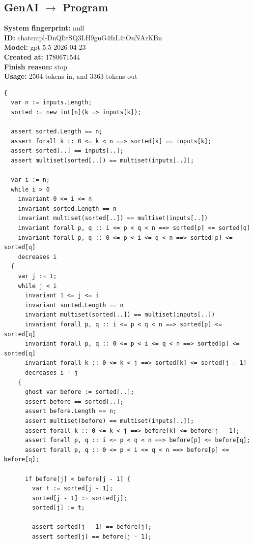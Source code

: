 \documentclass{article}
\begin{document}
\subsection*{GenAI $\rightarrow$ Program}
\textbf{System fingerprint: }null
\\\textbf{ID: }chatcmpl-DnQIitSQ3LH9guG4fzL4tOuNArKBn
\\\textbf{Model: }gpt-5.5-2026-04-23
\\\textbf{Created at: }1780671544
\\\textbf{Finish reason: }stop
\\\textbf{Usage: }2504 tokens in, and 3363 tokens out
\begin{lstlisting}
{
  var n := inputs.Length;
  sorted := new int[n](k => inputs[k]);

  assert sorted.Length == n;
  assert forall k :: 0 <= k < n ==> sorted[k] == inputs[k];
  assert sorted[..] == inputs[..];
  assert multiset(sorted[..]) == multiset(inputs[..]);

  var i := n;
  while i > 0
    invariant 0 <= i <= n
    invariant sorted.Length == n
    invariant multiset(sorted[..]) == multiset(inputs[..])
    invariant forall p, q :: i <= p < q < n ==> sorted[p] <= sorted[q]
    invariant forall p, q :: 0 <= p < i <= q < n ==> sorted[p] <= sorted[q]
    decreases i
  {
    var j := 1;
    while j < i
      invariant 1 <= j <= i
      invariant sorted.Length == n
      invariant multiset(sorted[..]) == multiset(inputs[..])
      invariant forall p, q :: i <= p < q < n ==> sorted[p] <= sorted[q]
      invariant forall p, q :: 0 <= p < i <= q < n ==> sorted[p] <= sorted[q]
      invariant forall k :: 0 <= k < j ==> sorted[k] <= sorted[j - 1]
      decreases i - j
    {
      ghost var before := sorted[..];
      assert before == sorted[..];
      assert before.Length == n;
      assert multiset(before) == multiset(inputs[..]);
      assert forall k :: 0 <= k < j ==> before[k] <= before[j - 1];
      assert forall p, q :: i <= p < q < n ==> before[p] <= before[q];
      assert forall p, q :: 0 <= p < i <= q < n ==> before[p] <= before[q];

      if before[j] < before[j - 1] {
        var t := sorted[j - 1];
        sorted[j - 1] := sorted[j];
        sorted[j] := t;

        assert sorted[j - 1] == before[j];
        assert sorted[j] == before[j - 1];


\end{lstlisting}
\end{document}
